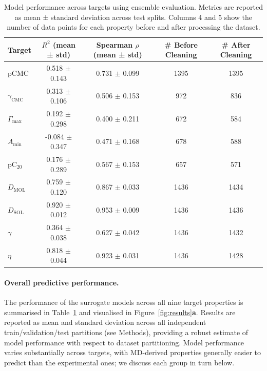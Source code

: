 \documentclass[letterpaper]{article}
\begin{document}
\begin{table}[ht]
\centering
\begin{tabular}{lcccc}
\toprule
\textbf{Target} & \textbf{$R^2$ (mean ± std)} & \textbf{Spearman $\rho$ (mean ± std)} & \textbf{\# Before Cleaning} & \textbf{\# After Cleaning}  \\
\midrule
pCMC & 0.518 $\pm$ 0.143 & 0.731 $\pm$ 0.099 & 1395 & 1395 \\
$\gamma_{\mathrm{CMC}}$ & 0.313 $\pm$ 0.106 & 0.506 $\pm$ 0.153 & 972 & 836  \\
$\Gamma_{\max}$ & 0.192 $\pm$ 0.298 & 0.400 $\pm$ 0.211 & 672 & 584 \\
$A_{\min}$ & -0.084 $\pm$ 0.347 & 0.471 $\pm$ 0.168 & 678 & 588 \\
pC$_{20}$ & 0.176 $\pm$ 0.289 & 0.567 $\pm$ 0.153 & 657 & 571  \\
$D_{\mathrm{MOL}}$ & 0.759 $\pm$ 0.120 & 0.867 $\pm$ 0.033 & 1436 & 1434 \\
$D_{\mathrm{SOL}}$ & 0.920 $\pm$ 0.012 & 0.953 $\pm$ 0.009 & 1436 & 1436 \\
$\gamma$ & 0.364 $\pm$ 0.038 & 0.627 $\pm$ 0.042 & 1436 & 1432 \\
$\eta$ & 0.818 $\pm$ 0.044 & 0.923 $\pm$ 0.031 & 1436 & 1428 \\
\bottomrule
\end{tabular}
\caption{Model performance across targets using ensemble evaluation. Metrics are reported as mean ± standard deviation across test splits. Columns 4 and 5 show the number of data points for each property before and after processing the dataset. }
\label{tab:results:model_performance}
\end{table}

\paragraph{Overall predictive performance.}
The performance of the surrogate models across all nine target properties is summarised in Table~\ref{tab:results:model_performance} and visualised in Figure~\ref{fig:results}\textbf{a}. Results are reported as mean and standard deviation across all independent train/validation/test partitions (see Methods), providing a robust estimate of model performance with respect to dataset partitioning. Model performance varies substantially across targets, with MD-derived properties generally easier to predict than the experimental ones; we discuss each group in turn below.
\end{document}
